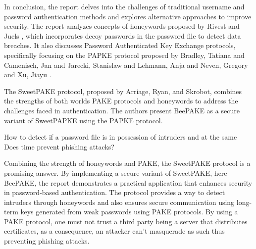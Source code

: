 \documentclass[../main.tex]{subfiles}
\begin{document}
In conclusion, the report delves into the challenges of traditional username
and password authentication methods and explores alternative approaches to
improve security. The report analyzes concepts of honeywords proposed by Rivest
and Juels \cite{juels2013honeywords}, which incorporates decoy passwords in the
password file to detect data breaches. It also discusses Password Authenticated
Key Exchange protocols, specifically focusing on the PAPKE protocol proposed by
Bradley, Tatiana and Camenisch, Jan and Jarecki, Stanislaw and Lehmann, Anja
and Neven, Gregory and Xu, Jiayu \cite{bradley2019password}.

The SweetPAKE protocol, proposed by Arriage, Ryan, and Skrobot, combines the
strengths of both worlds PAKE protocols and honeywords to address the
challenges faced in authentication. The authors present BeePAKE as a secure
variant of SweetPAPKE using the PAPKE protocol.

How to detect if a password file is in possession of intruders and at the same
Does time prevent phishing attacks?

Combining the strength of honeywords and PAKE, the SweetPAKE protocol is a
promising answer. By implementing a secure variant of SweetPAKE, here BeePAKE,
the report demonstrates a practical application that enhances security in
password-based authentication. The protocol provides a way to detect intruders
through honeywords and also ensures secure communication using long-term keys
generated from weak passwords using PAKE protocols. By using a PAKE protocol,
one must not trust a third party being a server that distributes certificates,
as a consequence, an attacker can't masquerade as such thus preventing phishing
attacks.
\end{document}
